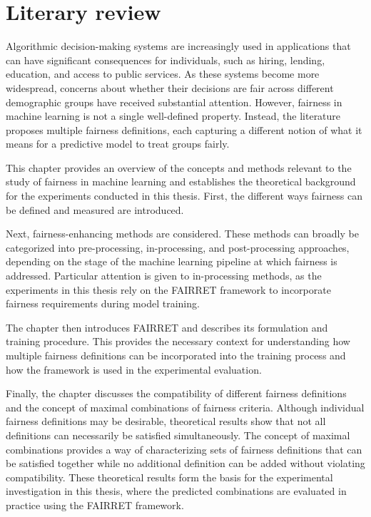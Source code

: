 \chapter{Literary review}
Algorithmic decision-making systems are increasingly used in applications that can have significant consequences for individuals, such as hiring, lending, education, and access to public services. As these systems become more widespread, concerns about whether their decisions are fair across different demographic groups have received substantial attention. However, fairness in machine learning is not a single well-defined property. Instead, the literature proposes multiple fairness definitions, each capturing a different notion of what it means for a predictive model to treat groups fairly.

This chapter provides an overview of the concepts and methods relevant to the study of fairness in machine learning and establishes the theoretical background for the experiments conducted in this thesis. First, the different ways fairness can be defined and measured are introduced.

Next, fairness-enhancing methods are considered. These methods can broadly be categorized into pre-processing, in-processing, and post-processing approaches, depending on the stage of the machine learning pipeline at which fairness is addressed. Particular attention is given to in-processing methods, as the experiments in this thesis rely on the FAIRRET framework to incorporate fairness requirements during model training.

The chapter then introduces FAIRRET and describes its formulation and training procedure. This provides the necessary context for understanding how multiple fairness definitions can be incorporated into the training process and how the framework is used in the experimental evaluation.

Finally, the chapter discusses the compatibility of different fairness definitions and the concept of maximal combinations of fairness criteria. Although individual fairness definitions may be desirable, theoretical results show that not all definitions can necessarily be satisfied simultaneously. The concept of maximal combinations provides a way of characterizing sets of fairness definitions that can be satisfied together while no additional definition can be added without violating compatibility. These theoretical results form the basis for the experimental investigation in this thesis, where the predicted combinations are evaluated in practice using the FAIRRET framework.

